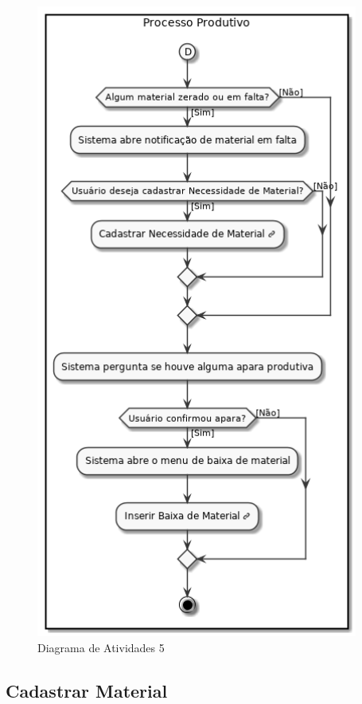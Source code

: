 \documentclass[rascunho,xindy,acronym,symbols]{fei}
\begin{document}
\begin{figure}[H]
    \centering
    \includegraphics[scale=0.6, width=300pt]{./Images/DA_Processo_Produtivo5.png}
    \caption{Diagrama de Atividades 5}
    \label{fig:diag_atv5}
\end{figure}

\subsection{Cadastrar Material}
\end{document}
